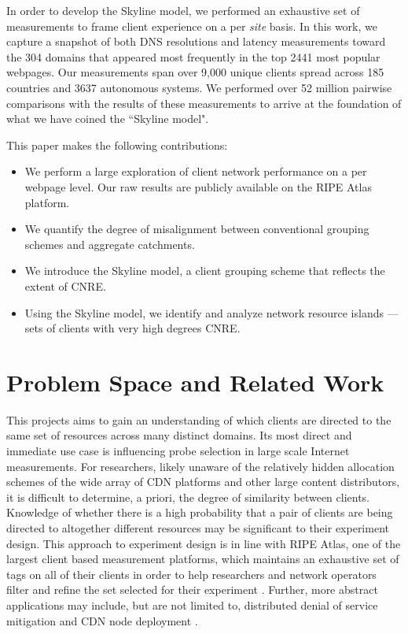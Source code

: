 In order to develop the Skyline model, we performed an exhaustive set of measurements to frame
client experience on a per \emph{site} basis. In this work, we capture a
snapshot of both DNS resolutions and latency measurements toward the 304 domains that appeared most
frequently in the top 2441 most popular webpages. Our measurements span over
9,000 unique
clients spread across 185 countries and 3637 autonomous systems. We performed over 52 million pairwise
comparisons with the results of these measurements to arrive at the foundation of what we have
coined the ``Skyline model". 

This paper makes the following contributions: %

\begin{itemize}%
    \item We perform a large exploration of client network performance on a per webpage level. Our
        raw results are publicly available on the RIPE Atlas platform.
    \item  We quantify the degree of misalignment between conventional grouping schemes
        and aggregate catchments.
    \item  We introduce the Skyline model, a client grouping scheme that reflects the
        extent of CNRE.
    \item  Using the Skyline model, we identify and analyze network resource islands --- 
        sets of clients with very high degrees CNRE. 
\end{itemize}

\section{Problem Space and Related Work} \label{skyspace}

This projects aims to gain an understanding of which clients are directed to the same set of
resources across many distinct domains. Its most direct and immediate use case is influencing probe
selection in large scale Internet measurements. For researchers, likely unaware of the relatively
hidden allocation schemes of the wide array of CDN platforms and other large content distributors,
it is difficult to determine, a priori, the degree of similarity between clients. Knowledge of
whether there is a high probability that a pair of clients are being directed to altogether
different resources may be significant to their experiment design. This approach to experiment
design is in line with RIPE Atlas, one of the largest client based measurement platforms,
which maintains
an exhaustive set of tags on all of their clients in order to help researchers and network operators
filter and refine the set selected for their experiment \cite{ripe-atlas}. Further, more abstract
applications may include, but are not limited to, distributed denial of service mitigation
\cite{anycastvsddos} and CDN node deployment \cite{35590, Tariq}.

